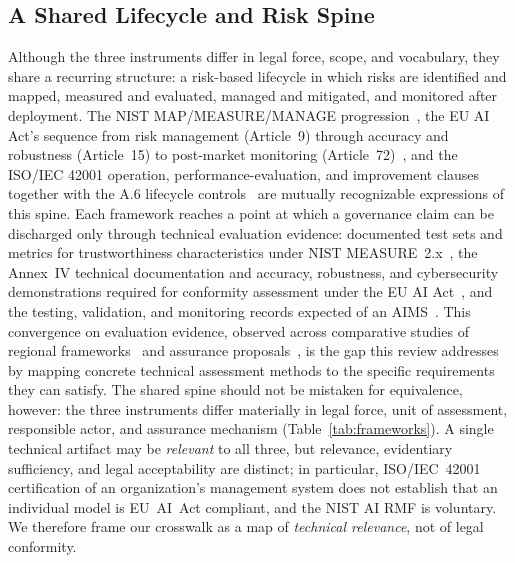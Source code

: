 \subsection{A Shared Lifecycle and Risk Spine}
\label{subsec:spine}
Although the three instruments differ in legal force, scope, and vocabulary, they share a recurring structure: a risk-based lifecycle in which risks are identified and mapped, measured and evaluated, managed and mitigated, and monitored after deployment. The NIST MAP/MEASURE/MANAGE progression~\cite{nist2023airmf}, the EU AI Act's sequence from risk management (Article~9) through accuracy and robustness (Article~15) to post-market monitoring (Article~72)~\cite{euaiact2024}, and the ISO/IEC 42001 operation, performance-evaluation, and improvement clauses together with the A.6 lifecycle controls~\cite{iso42001} are mutually recognizable expressions of this spine. Each framework reaches a point at which a governance claim can be discharged only through technical evaluation evidence: documented test sets and metrics for trustworthiness characteristics under NIST MEASURE~2.x~\cite{nist2023airmf}, the Annex~IV technical documentation and accuracy, robustness, and cybersecurity demonstrations required for conformity assessment under the EU AI Act~\cite{euaiact2024}, and the testing, validation, and monitoring records expected of an AIMS~\cite{iso42001}. This convergence on evaluation evidence, observed across comparative studies of regional frameworks~\cite{almaamari2025crossregional,gadekallu2025responsibleaisurvey} and assurance proposals~\cite{lupo2026trustworthyposture,puhlfurss2025modelcards}, is the gap this review addresses by mapping concrete technical assessment methods to the specific requirements they can satisfy. The shared spine should not be mistaken for equivalence, however: the three instruments differ materially in legal force, unit of assessment, responsible actor, and assurance mechanism (Table~\ref{tab:frameworks}). A single technical artifact may be \emph{relevant} to all three, but relevance, evidentiary sufficiency, and legal acceptability are distinct; in particular, ISO/IEC~42001 certification of an organization's management system does not establish that an individual model is EU~AI~Act compliant, and the NIST AI RMF is voluntary. We therefore frame our crosswalk as a map of \emph{technical relevance}, not of legal conformity.


